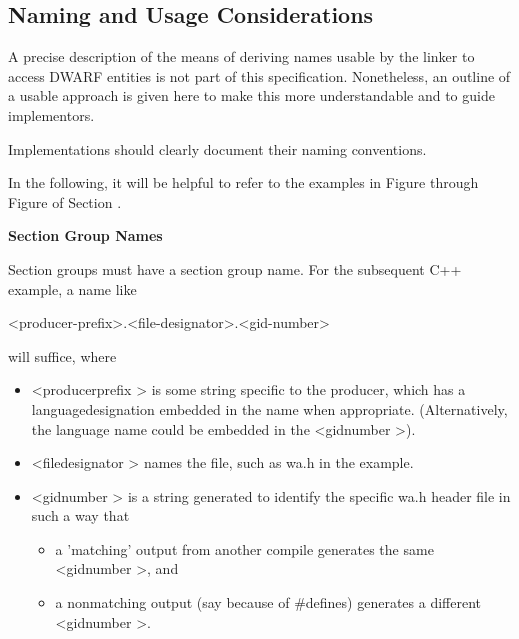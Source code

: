 \subsection{Naming and Usage Considerations}
\label{app:namingandusageconsiderations}

A precise description of the means of deriving names usable
by the linker to access DWARF entities is not part of this
specification. Nonetheless, an outline of a usable approach
is given here to make this more understandable and to guide
implementors.

Implementations should clearly document their naming conventions.

In the following, it will be helpful to refer to the examples
in 
Figure 
through 
Figure 
of 
Section .

\textbf{Section Group Names}

Section groups must have a section group name. For the subsequent C++ example, a name like

<producer-prefix>.<file-designator>.<gid-number>

will suffice, where

\begin{itemize}

\item  \textless producer\dash prefix \textgreater 
is some string specific to the
producer, which has a language\dash designation embedded in the
name when appropriate. (Alternatively, the language name
could be embedded in the 
\textless gid\dash number \textgreater).


\item  \textless file\dash designator \textgreater
names the file, such as wa.h in
the example.


\item  \textless gid\dash number \textgreater
is a string generated to identify the
specific wa.h header file in such a way that

\begin{itemize}

\item  a 'matching' output from another compile generates
the same 
\textless gid\dash number \textgreater,
and

\item  a non\dash matching output (say because of \#defines)
generates a different 
\textless gid\dash number \textgreater.
\end{itemize}

\end{itemize}

